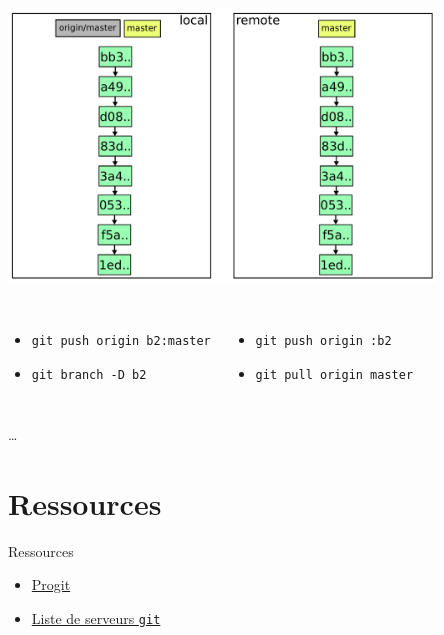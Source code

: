 \documentclass{beamer}
\newcommand{\git}{\texttt{git}\xspace}
\begin{document}
\begin{frame}{}
  \centering
  \includegraphics[width=0.85\textwidth]{img/10.pdf}
  \begin{columns}
    \begin{itemize}
    \small
    \item \lstinline|git push origin b2:master|
    \item \lstinline|git branch -D b2|
    \end{itemize}
    \begin{itemize}
    \small
    \item \lstinline|git push origin :b2|
    \item \lstinline|git pull origin master|
    \end{itemize}
  \end{columns}
\end{frame}

\begin{frame}{}
  \begin{center}
  \Huge \dots
  \end{center}
\end{frame}

\section{Ressources}
\begin{frame}{Ressources}
  \begin{itemize}
  \item \href{http://progit.org/about.html}{Progit}
  \item \href{http://git.or.cz/gitwiki/GitHosting}{Liste de serveurs \git}
  \end{itemize}
\end{frame}
\end{document}

